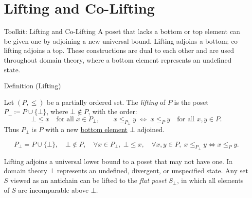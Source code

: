 
\section{Lifting and Co-Lifting}
\label{sec:lifting}

\begin{toolkitbox}{Toolkit: Lifting and Co-Lifting}
A poset that lacks a bottom or top element can be given one by adjoining
a new universal bound.  Lifting adjoins a bottom; co-lifting adjoins a
top.  These constructions are dual to each other and are used throughout
domain theory, where a bottom element represents an undefined state.
\end{toolkitbox}


\begin{definitionbox}{Definition (Lifting)}
\begin{definition}[Lifting]
\label{def:lifting}
Let $(P, \leq)$ be a partially ordered set.  The \emph{lifting} of $P$
is the poset $P_{\bot} \coloneqq P \cup \{\bot\}$, where $\bot \notin P$,
with the order:
\[
\bot \leq x \quad \text{for all } x \in P_{\bot},
\qquad
x \leq_{P_{\bot}} y \;\Longleftrightarrow\; x \leq_P y
\quad \text{for all } x, y \in P.
\]
Thus $P_{\bot}$ is $P$ with a new
\hyperref[def:bottom-element]{bottom element} $\bot$ adjoined.
\end{definition}
\end{definitionbox}

\begin{remark*}
\[
P_{\bot} = P \cup \{\bot\},\quad
\bot \notin P,\quad
\forall x \in P_{\bot},\; \bot \leq x,\quad
\forall x,y \in P,\; x \leq_{P_\bot} y \Leftrightarrow x \leq_P y.
\]
\end{remark*}

\begin{remark*}[Interpretation]
Lifting adjoins a universal lower bound to a poset that may not have one.
In domain theory $\bot$ represents an undefined, divergent, or
unspecified state.  Any set $S$ viewed as an antichain can be lifted to
the \emph{flat poset} $S_{\bot}$, in which all elements of $S$ are
incomparable above $\bot$.
\end{remark*}

